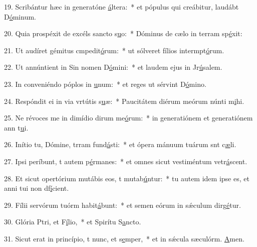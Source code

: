 19. Scribántur hæc in generatóne \uline{á}ltera:~* et pópulus qui creábitur, laudábt D\uline{ó}minum.\par 
20. Quia prospéxit de excéls sancto s\uline{u}o:~* Dóminus de cælo in terram sp\uline{é}xit:\par 
21. Ut audíret gémitus cmpedit\uline{ó}rum:~* ut sólveret fílios intermpt\uline{ó}rum.\par 
22. Ut annúntient in Sin nomen D\uline{ó}mini:~* et laudem ejus in Jr\uline{ú}salem.\par 
23. In conveniéndo póplos in \uline{u}num:~* et reges ut sérvint D\uline{ó}mino.\par 
24. Respóndit ei in via vrtútis s\uline{u}æ:~* Paucitátem diérum meórum núnti m\uline{i}hi.\par 
25. Ne révoces me in dimídio dirum me\uline{ó}rum:~* in generatiónem et generatiónem ann t\uline{u}i.\par 
26. Inítio tu, Dómine, trram fund\uline{á}sti:~* et ópera mánuum tuárum snt c\uline{æ}li.\par 
27. Ipsi períbunt, t autem p\uline{é}rmanes:~* et omnes sicut vestiméntum vetr\uline{á}scent.\par 
28. Et sicut opertórium mutábis eos, t mutab\uline{ú}ntur:~* tu autem idem ipse es, et anni tui non df\uline{í}cient.\par 
29. Fílii servórum tuórm habit\uline{á}bunt:~* et semen eórum in sǽculum dirg\uline{é}tur.\par 
30. Glória Ptri, et F\uline{í}lio,~* et Spirítu S\uline{a}ncto.\par 
31. Sicut erat in princípio, t nunc, et s\uline{e}mper,~* et in sǽcula sæculórm. \uline{A}men.\par 
